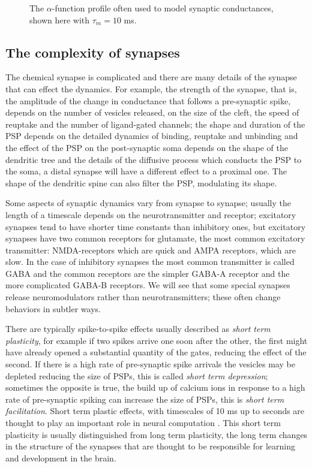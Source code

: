 \documentclass[11pt,a4paper]{scrartcl}
\begin{document}
\begin{figure}
\begin{center}

\end{center}
\caption{The $\alpha$-function profile often used to model synaptic conductances, shown here with $\tau_m=10$ ms.\label{fig:alpha}}
\end{figure}

\subsection*{The complexity of synapses}

The chemical synapse is complicated and there are many details of the
synapse that can effect the dynamics. For example, the strength of the
synapse, that is, the amplitude of the change in conductance that
follows a pre-synaptic spike, depends on the number of vesicles
released, on the size of the cleft, the speed of reuptake and the
number of ligand-gated channels; the shape and duration of the PSP
depends on the detailed dynamics of binding, reuptake and unbinding
and the effect of the PSP on the post-synaptic soma depends on the
shape of the dendritic tree and the details of the diffusive process
which conducts the PSP to the soma, a distal synapse will have a
different effect to a proximal one. The shape of the dendritic spine
can also filter the PSP, modulating its shape.

Some aspects of synaptic dynamics vary from synapse to synapse;
usually the length of a timescale depends on the neurotransmitter and
receptor; excitatory synapses tend to have shorter time constants than
inhibitory ones, but excitatory synapses have two common receptors for
glutamate, the most common excitatory transmitter: NMDA-receptors
which are quick and AMPA receptors, which are slow. In the case of
inhibitory synapses the most common transmitter is called GABA and the
common receptors are the simpler GABA-A receptor and the more
complicated GABA-B receptors. We will see that some special synapses
release neuromodulators rather than neurotransmitters; these often
change behaviors in subtler ways.

There are typically spike-to-spike effects usually described as
\textsl{short term plasticity}, for example if two spikes arrive one
soon after the other, the first might have already opened a
substantial quantity of the gates, reducing the effect of the second.
If there is a high rate of pre-synaptic spike arrivals the vesicles
may be depleted reducing the size of PSPs, this is called
\textsl{short term depression}; sometimes the opposite is true, the
build up of calcium ions in response to a high rate of pre-synaptic
spiking can increase the size of PSPs, this is \textsl{short term
  facilitation}. Short term plastic effects, with timescales of 10 ms
up to seconds are thought to play an important role in neural
computation \cite{AbbottEtAll1997a}. This short term plasticity is
usually distinguished from long term plasticity, the long term changes
in the structure of the synapses that are thought to be responsible
for learning and development in the brain.
\end{document}
